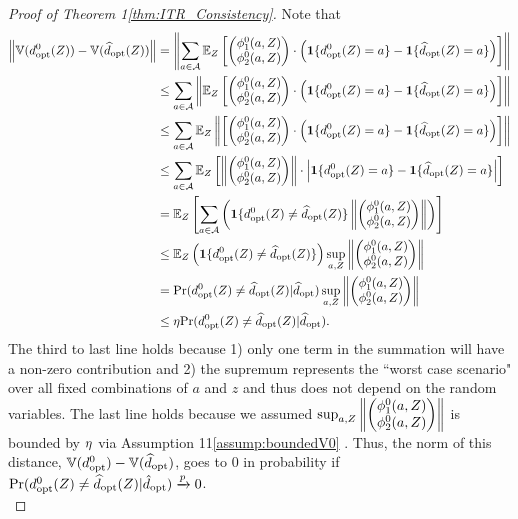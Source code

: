 {\begin{proof}[Proof of Theorem \ifnum{} 1\else \ref{thm:ITR_Consistency}\fi]
Note that
\begin{equation*}
\begin{split}
\left\| \mathbb{V}(\doptTRUE(Z)) - \mathbb{V}(\doptHAT(Z)) \right\| 
&= \left\|\sum_{a \in \mathcal{A}} \mathbb{E}_Z\left[ \valueTRUE
\cdot \left( \mathbf{1}\{\doptTRUE(Z) = a\} - \mathbf{1}\{\doptHAT(Z) = a\} \right)
\right] \right\| \\
&\leq \sum_{a \in \mathcal{A}} \left\|\mathbb{E}_Z\left[ \valueTRUE
\cdot \left( \mathbf{1}\{\doptTRUE(Z) = a\} - \mathbf{1}\{\doptHAT(Z) = a\} \right)
\right] \right\| \\
&\leq \sum_{a \in \mathcal{A}} \mathbb{E}_Z \left\| \left[ \valueTRUE
\cdot \left( \mathbf{1}\{\doptTRUE(Z) = a\} - \mathbf{1}\{\doptHAT(Z) = a\} \right)
\right] \right\| \\
&\leq \sum_{a \in \mathcal{A}} \mathbb{E}_Z \left[ \left\| \valueTRUE \right\|
\cdot \left| \mathbf{1}\{\doptTRUE(Z) = a\} - \mathbf{1}\{\doptHAT(Z) = a\} \right|
\right] \\
&= \mathbb{E}_Z \left[ \sum_{a \in \mathcal{A}} \left( \mathbf{1} \{\doptTRUE(Z) \neq \doptHAT(Z)\} \left\|\valueTRUE\right\| \right) \right] \\
&\leq \mathbb{E}_Z \left( \mathbf{1} \{\doptTRUE(Z) \neq \doptHAT(Z)\} \right) \sup_{a,Z} \left\| \valueTRUE \right\| \\
&= \text{Pr}(\doptTRUE(Z) \neq \doptHAT(Z) | \doptHAT) \sup_{a,Z} \left\| \valueTRUE \right\|\\
&\leq \sevenbound \text{Pr}(\doptTRUE(Z) \neq \doptHAT(Z) | \doptHAT).\\
\end{split} %
\end{equation*} The third to last line holds because 1) only one term in the summation will have a non-zero contribution and 2) the supremum represents the ``worst case scenario" over all fixed combinations of $a$ and $z$ and thus does not depend on the random variables. The last line holds because we assumed $\sup_{a,Z} \left\| \begin{pmatrix}\phi_1^0(a,Z) \\ \phi_2^0(a,Z) \end{pmatrix} \right\|$ is bounded by $\eta$ via Assumption \ifnum{} 11\else \ref{assump:boundedV0} \fi. Thus, the norm of this distance, $\mathbb{V}(d^0_{\text{opt}}) - \mathbb{V}(\widehat{d}_{\text{opt}})$, goes to $0$ in probability if $\text{Pr}(d^0_{\text{opt}}(Z) \neq \widehat{d}_{\text{opt}}(Z)|\hat{d}_\text{opt}) \xrightarrow{p} 0$.\\


\end{proof}}

